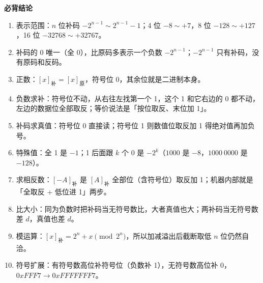\documentclass[10pt,a4paper]{ctexart}
\begin{document}



\textbf{必背结论}

\begin{enumerate}

\item 表示范围：$n$ 位补码 $-2^{n-1}\sim 2^{n-1}-1$；4 位 $-8\sim+7$，8 位 $-128\sim+127$，16 位 $-32768\sim+32767$。

\item 补码的 0 唯一（全 0），比原码多表示一个负数 $-2^{n-1}$；$-2^{n-1}$ 只有补码，没有原码和反码。

\item 正数：$[x]_补=[x]_原$，符号位 0，其余位就是二进制本身。

\item 负数求补：符号位不动，从右往左找第一个 1，这个 1 和它右边的 0 都不动，左边的数据位全部取反；等价说法是「按位取反、末位加 1」。

\item 补码求真值：符号位 0 直接读；符号位 1 则数值位取反加 1 得绝对值再加负号。

\item 特殊值：全 1 是 $-1$；1 后面跟 $k$ 个 0 是 $-2^k$（$1000$ 是 $-8$，$1000\ 0000$ 是 $-128$）。

\item 求相反数：$[-A]_补$ 是 $[A]_补$ 全部位（含符号位）取反加 1；机器内部就是「全取反 + 低位进 1」两步。

\item 比大小：同为负数时把补码当无符号数比，大者真值也大；两补码当无符号数差 $d$，真值也差 $d$。

\item 模运算：$[x]_补=2^n+x \pmod{2^n}$，所以加减溢出后截断取低 $n$ 位仍然自洽。

\item 符号扩展：有符号数高位补符号位（负数补 1），无符号数高位补 0，$0xFFF7\to0xFFFFFFF7$。

\end{enumerate}
\end{document}
